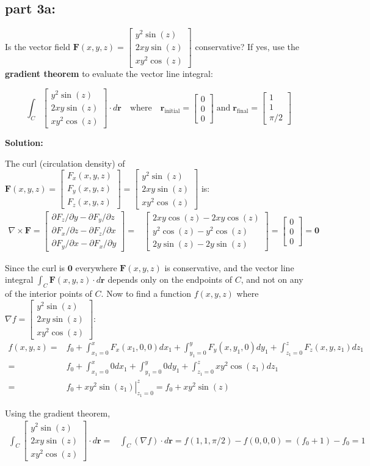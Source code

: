 \documentclass{article}
\newcommand{\colvec}[3]{\begin{bmatrix} #1 \\ #2 \\ #3 \end{bmatrix}}
\newcommand{\at}[1]{\left. #1 \right|}
\newcommand{\dr}[1]{\textcolor{dark_red}{#1}}
\begin{document}
\subsection*{part 3a:}

Is the vector field \(\mathbf{F}(x,y,z) = \colvec{y^2\sin(z)}{2xy\sin(z)}{xy^2\cos(z)}\) conservative? If yes, use the {\bf gradient theorem} to evaluate the vector line integral:

\[\int_C \colvec{y^2\sin(z)}{2xy\sin(z)}{xy^2\cos(z)} \cdot d\mathbf{r} \quad\text{where}\quad \mathbf{r}_\text{initial} = \colvec{0}{0}{0} \;\text{and}\; \mathbf{r}_\text{final} = \colvec{1}{1}{\pi/2}\] 

\vspace{5mm}
\dr{\textbf{Solution:}}

\dr{The curl (circulation density) of \(\mathbf{F}(x,y,z) = \colvec{F_x(x,y,z)}{F_y(x,y,z)}{F_z(x,y,z)} = \colvec{y^2\sin(z)}{2xy\sin(z)}{xy^2\cos(z)}\) is: 
\begin{align*}
\nabla \times \mathbf{F} = \colvec{\partial F_z/\partial y - \partial F_y/\partial z}{\partial F_x/\partial z - \partial F_z/\partial x}{\partial F_y/\partial x - \partial F_x/\partial y} = & \colvec{2xy\cos(z) - 2xy\cos(z)}{y^2\cos(z) - y^2\cos(z)}{2y\sin(z) - 2y\sin(z)} = \colvec{0}{0}{0} = \mathbf{0}
\end{align*}}

\dr{Since the curl is \(\mathbf{0}\) everywhere \(\mathbf{F}(x,y,z)\) is conservative, and the vector line integral \(\int_C \mathbf{F}(x,y,z) \cdot d\mathbf{r}\) depends only on the endpoints of \(C\), and not on any of the interior points of \(C\). Now to find a function \(f(x,y,z)\) where \(\nabla f = \colvec{y^2\sin(z)}{2xy\sin(z)}{xy^2\cos(z)}\):
\begin{align*}
f(x,y,z) = & f_0 + \int_{x_1 = 0}^x F_x(x_1,0,0)dx_1 + \int_{y_1 = 0}^y F_y(x,y_1,0)dy_1 + \int_{z_1 = 0}^z F_z(x,y,z_1)dz_1 \\
= & f_0 + \int_{x_1 = 0}^x 0dx_1 + \int_{y_1 = 0}^y 0dy_1 + \int_{z_1 = 0}^z xy^2\cos(z_1) dz_1 \\
= & f_0 + \at{xy^2\sin(z_1)}_{z_1 = 0}^z 
= f_0 + xy^2\sin(z)
\end{align*}}

\dr{Using the gradient theorem,
\begin{align*}
\int_C \colvec{y^2\sin(z)}{2xy\sin(z)}{xy^2\cos(z)} \cdot d\mathbf{r} = & \int_C (\nabla f) \cdot d\mathbf{r} 
= f(1,1,\pi/2) - f(0,0,0) 
= (f_0 + 1) - f_0 
= 1
\end{align*}}
\end{document}
